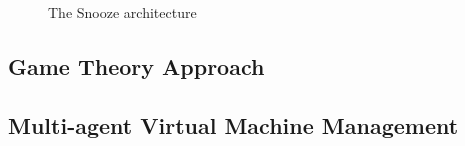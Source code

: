 \begin{figure}[!ht]
\label{fig:snooze_arch}
\caption{The Snooze architecture \cite{Feller:2012kf}}
\end{figure}

\subsection{Game Theory Approach}
\label{sec:sota_game_theroy}
\cite{Xu:2014do}

\subsection{Multi-agent Virtual Machine Management}
\label{sec:sota_mutli_agent}
\cite{Anderson:2013bh}

